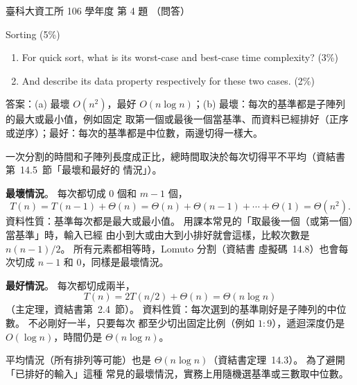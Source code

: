 \begin{pastexam}[label={px:ntust-106-ice-04}]{臺科大資工所 106 學年度 第 4 題}
（問答）

Sorting (5\%)
\begin{enumerate}[label=(\alph*)]
\item For quick sort, what is its worst-case and best-case time complexity? (3\%)
\item And describe its data property respectively for these two cases. (2\%)
\end{enumerate}
\end{pastexam}

\begin{pastsoln}
答案：(a) 最壞 $O(n^2)$，最好 $O(n\log n)$；(b) 最壞：每次的基準都是子陣列的最大或最小值，例如固定
取第一個或最後一個當基準、而資料已經排好（正序或逆序）；最好：每次的基準都是中位數，兩邊切得一樣大。

一次分割的時間和子陣列長度成正比，總時間取決於每次切得平不平均（資結書第~14.5~節「最壞和最好的
情況」）。

\textbf{最壞情況}。 每次都切成 $0$ 個和 $m - 1$ 個，
\[
T(n) = T(n-1) + \Theta(n) = \Theta(n) + \Theta(n-1) + \cdots + \Theta(1) = \Theta(n^2).
\]
資料性質：基準每次都是最大或最小值。 用課本常見的「取最後一個（或第一個）當基準」時，輸入已經
由小到大或由大到小排好就會這樣，比較次數是 $n(n-1)/2$。 所有元素都相等時，Lomuto 分割（資結書
虛擬碼~14.8）也會每次切成 $n - 1$ 和 $0$，同樣是最壞情況。

\textbf{最好情況}。 每次都切成兩半，
\[
T(n) = 2T(n/2) + \Theta(n) = \Theta(n\log n)
\]
（主定理，資結書第~2.4~節）。 資料性質：每次選到的基準剛好是子陣列的中位數。 不必剛好一半，只要每次
都至少切出固定比例（例如 $1:9$），遞迴深度仍是 $O(\log n)$，時間仍是 $\Theta(n\log n)$。

平均情況（所有排列等可能）也是 $\Theta(n\log n)$（資結書定理~14.3）。 為了避開「已排好的輸入」這種
常見的最壞情況，實務上用隨機選基準或三數取中位數。
\end{pastsoln}
